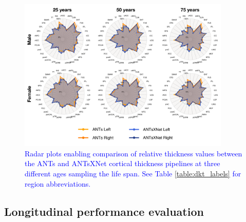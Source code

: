 \documentclass[12pt,]{article}
\begin{document}
\begin{figure}[htb]
  \centering
    \includegraphics[width=0.9\textwidth]{Figures/radarSPRB.pdf}
  \caption{\textcolor{blue}{Radar plots enabling comparison of relative thickness values between
  the ANTs and ANTsXNet cortical thickness pipelines at three different ages
  sampling the life span.  See Table \ref{table:dkt_labels} for region abbreviations. }}
  \label{fig:radar}
\end{figure}

\hypertarget{longitudinal-performance-evaluation}{%
\subsection*{Longitudinal performance
evaluation}\label{longitudinal-performance-evaluation}}
\end{document}
